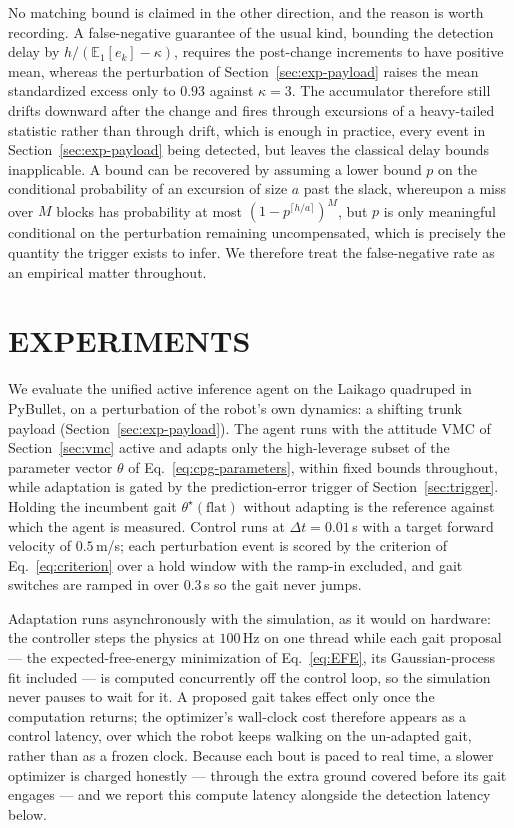 \documentclass[letterpaper, 10 pt, conference]{ieeeconf}  %
\newcommand{\E}{\mathbb{E}}
\begin{document}
No matching bound is claimed in the other direction, and the reason is worth recording.
A false-negative guarantee of the usual kind, bounding the detection delay by $h/(\E_1[e_k] - \kappa)$, requires the post-change increments to have positive mean, whereas the perturbation of Section~\ref{sec:exp-payload} raises the mean standardized excess only to $0.93$ against $\kappa = 3$.
The accumulator therefore still drifts downward after the change and fires through excursions of a heavy-tailed statistic rather than through drift, which is enough in practice, every event in Section~\ref{sec:exp-payload} being detected, but leaves the classical delay bounds inapplicable.
A bound can be recovered by assuming a lower bound $p$ on the conditional probability of an excursion of size $a$ past the slack, whereupon a miss over $M$ blocks has probability at most $(1 - p^{\lceil h/a \rceil})^{M}$, but $p$ is only meaningful conditional on the perturbation remaining uncompensated, which is precisely the quantity the trigger exists to infer.
We therefore treat the false-negative rate as an empirical matter throughout.

\section{EXPERIMENTS}
\label{sec:experiments}

We evaluate the unified active inference agent on the Laikago quadruped in PyBullet, on a perturbation of the robot's own dynamics: a shifting trunk payload (Section~\ref{sec:exp-payload}).
The agent runs with the attitude VMC of Section~\ref{sec:vmc} active and adapts only the high-leverage subset of the parameter vector $\theta$ of Eq.~\ref{eq:cpg-parameters}, within fixed bounds throughout, while adaptation is gated by the prediction-error trigger of Section~\ref{sec:trigger}.
Holding the incumbent gait $\theta^{\star}(\text{flat})$ without adapting is the reference against which the agent is measured.
Control runs at $\Delta t = 0.01$\,s with a target forward velocity of $0.5$\,m/s; each perturbation event is scored by the criterion of Eq.~\ref{eq:criterion} over a hold window with the ramp-in excluded, and gait switches are ramped in over $0.3$\,s so the gait never jumps.

Adaptation runs asynchronously with the simulation, as it would on hardware: the controller steps the physics at $100$\,Hz on one thread while each gait proposal --- the expected-free-energy minimization of Eq.~\ref{eq:EFE}, its Gaussian-process fit included --- is computed concurrently off the control loop, so the simulation never pauses to wait for it.
A proposed gait takes effect only once the computation returns; the optimizer's wall-clock cost therefore appears as a control latency, over which the robot keeps walking on the un-adapted gait, rather than as a frozen clock.
Because each bout is paced to real time, a slower optimizer is charged honestly --- through the extra ground covered before its gait engages --- and we report this compute latency alongside the detection latency below.
\end{document}
